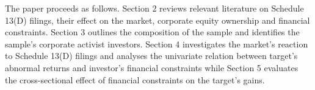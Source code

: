 \documentclass[12pt]{article}
\begin{document}
The paper proceeds as follows. Section 2 reviews relevant literature on Schedule 13(D) filings, their effect on the market, corporate equity ownership and financial constraints. Section 3 outlines the composition of the sample and identifies the sample's corporate activist investors. Section 4 investigates the market's reaction to Schedule 13(D) filings and analyses the univariate relation between target's abnormal returns and investor's financial constraints while Section 5 evaluates the cross-sectional effect of financial constraints on the target's gains.



\end{document}

